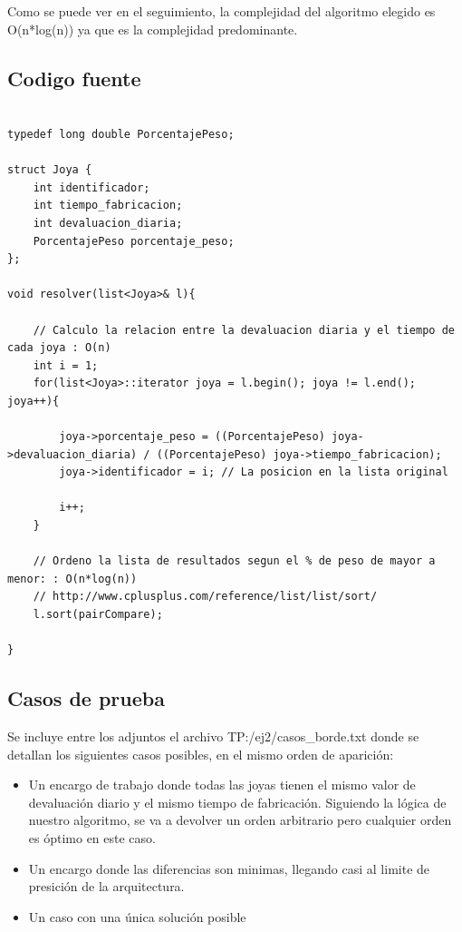 Como se puede ver en el seguimiento, la complejidad del algoritmo elegido es O(n*log(n)) ya que es la complejidad predominante.\\

\subsection{Codigo fuente}

\begin{lstlisting}
               
typedef long double PorcentajePeso;

struct Joya {
	int identificador;
	int tiempo_fabricacion;
	int devaluacion_diaria;
	PorcentajePeso porcentaje_peso;
};

void resolver(list<Joya>& l){
	
	// Calculo la relacion entre la devaluacion diaria y el tiempo de cada joya : O(n)
	int i = 1;
	for(list<Joya>::iterator joya = l.begin(); joya != l.end(); joya++){
		
		joya->porcentaje_peso = ((PorcentajePeso) joya->devaluacion_diaria) / ((PorcentajePeso) joya->tiempo_fabricacion);
		joya->identificador = i; // La posicion en la lista original
		
		i++;
	}
	
	// Ordeno la lista de resultados segun el % de peso de mayor a menor: : O(n*log(n)) 
	// http://www.cplusplus.com/reference/list/list/sort/
	l.sort(pairCompare);

}
\end{lstlisting}

\subsection{Casos de prueba}

Se incluye entre los adjuntos el archivo TP:/ej2/casos\_borde.txt donde se detallan los siguientes casos posibles, en el mismo orden de aparici\'on:

\begin{itemize}
\item Un encargo de trabajo donde todas las joyas tienen el mismo valor de devaluaci\'on diario y el mismo tiempo de fabricaci\'on. Siguiendo la l\'ogica de nuestro algoritmo, se va a devolver un orden arbitrario pero cualquier orden es \'optimo en este caso.
\item Un encargo donde las diferencias son minimas, llegando casi al limite de presici\'on de la arquitectura.
\item Un caso con una \'unica soluci\'on posible
\end{itemize}

